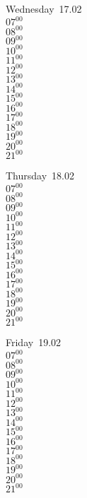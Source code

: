\documentclass[11pt,a4paper]{book}\usepackage[]{graphicx}\usepackage[]{color}
\begin{document}
\begin{weekdaybox}
  Wednesday~17.02\\
  { 
  \vfill
  $07^{00}$\\
$08^{00}$\\
$09^{00}$\\
$10^{00}$\\
$11^{00}$\\
$12^{00}$\\
$13^{00}$\\
$14^{00}$\\
$15^{00}$\\
$16^{00}$\\
$17^{00}$\\
$18^{00}$\\
$19^{00}$\\
$20^{00}$\\
$21^{00}$\\
  }
\end{weekdaybox}
\clearpage
\begin{headerbox}
\end{headerbox}
\begin{weekdaybox}
  Thursday~18.02\\
  { 
  \vfill
  $07^{00}$\\
$08^{00}$\\
$09^{00}$\\
$10^{00}$\\
$11^{00}$\\
$12^{00}$\\
$13^{00}$\\
$14^{00}$\\
$15^{00}$\\
$16^{00}$\\
$17^{00}$\\
$18^{00}$\\
$19^{00}$\\
$20^{00}$\\
$21^{00}$\\
  }
\end{weekdaybox} 
\begin{weekdaybox}
  Friday~19.02\\
  { 
  \vfill
  $07^{00}$\\
$08^{00}$\\
$09^{00}$\\
$10^{00}$\\
$11^{00}$\\
$12^{00}$\\
$13^{00}$\\
$14^{00}$\\
$15^{00}$\\
$16^{00}$\\
$17^{00}$\\
$18^{00}$\\
$19^{00}$\\
$20^{00}$\\
$21^{00}$\\
  }
\end{weekdaybox}
\end{document}
